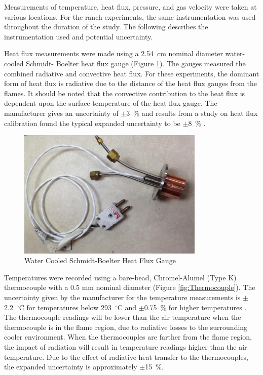 \documentclass[12pt,oneside]{book}
\begin{document}
Measurements of temperature, heat flux, pressure, and gas velocity were taken at various locations. For the ranch experiments, the same instrumentation was used throughout the duration of the study. The following describes the instrumentation used and potential uncertainty.

Heat flux measurements were made using a 2.54~cm nominal diameter water-cooled Schmidt- Boelter heat flux gauge (Figure \ref{fig:HeatFluxGauge}). The gauges measured the combined radiative and convective heat flux. For these experiments, the dominant form of heat flux is radiative due to the distance of the heat flux gauges from the flames. It should be noted that the convective contribution to the heat flux is dependent upon the surface temperature of the heat flux gauge. The manufacturer gives an uncertainty of $\pm$3~\% and results from a study on heat flux calibration found the typical expanded uncertainty to be $\pm$8~\% \cite{HeatFluxRoundRobin}.

\begin{figure} [H]
	\centering
	\includegraphics[width = 3.5in]{0_Images/Instrumentation/Heat_Flux_Gauge.jpg}
	\caption{Water Cooled Schmidt-Boelter Heat Flux Gauge}
	\label{fig:HeatFluxGauge}
\end{figure}

Temperatures were recorded using a bare-bead, Chromel-Alumel (Type K) thermocouple with a 0.5 mm nominal diameter (Figure \ref{fig:Thermocouple}). The uncertainty given by the manufacturer for the temperature measurements is $\pm$2.2~$^\circ$C for temperatures below 293~$^\circ$C and $\pm$0.75~\% for higher temperatures \cite{TemperatureHandbook}. The thermocouple readings will be lower than the air temperature when the thermocouple is in the flame region, due to radiative losses to the surrounding cooler environment. When the thermocouples are farther from the flame region, the impact of radiation will result in temperature readings higher than the air temperature. Due to the effect of radiative heat transfer to the thermocouples, the expanded uncertainty is approximately $\pm$15~\%.
\end{document}
